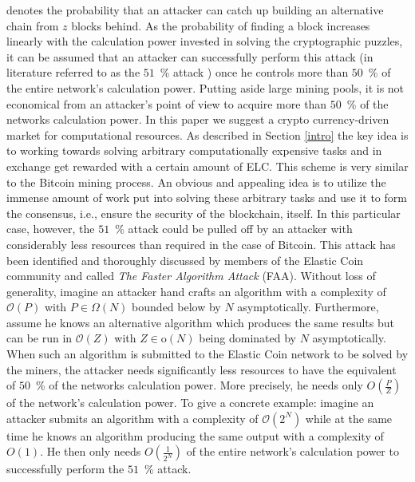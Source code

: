 \documentclass{sig-alternate}
\begin{document}
denotes the probability that an attacker can catch up building an alternative chain from $z$ blocks behind.
As the probability of finding a block increases linearly with the calculation power invested in solving the cryptographic puzzles, it can be assumed that an attacker can successfully perform this attack (in literature referred to as the $51$~\% attack \cite{eyal2014majority,vasek2014empirical}) once he controls more than $50$~\% of the entire network's calculation power.
Putting aside large mining pools, it is not economical from an attacker's point of view to acquire more than $50$~\% of the networks calculation power.
In this paper we suggest a crypto currency-driven market for computational resources. As described in Section \ref{intro} the key idea is to working towards solving arbitrary computationally expensive tasks and in exchange get rewarded with a certain amount of ELC.
This scheme is very similar to the Bitcoin mining process.
An obvious and appealing idea is to utilize the immense amount of work put into solving these arbitrary tasks and use it to form the consensus, i.e., ensure the security of the blockchain, itself. In this particular case, however, the $51$~\% attack could be pulled off by an attacker with considerably less resources than required in the case of Bitcoin. This attack has been identified and thoroughly discussed by members of the Elastic Coin community and called \emph{The Faster Algorithm Attack} (FAA).
Without loss of generality, imagine an attacker hand crafts an algorithm with a complexity of $\mathcal{O}(P)$ with $P \in \Omega(N)$ bounded below by $N$ asymptotically.
Furthermore, assume he knows an alternative algorithm which produces the same results but can be run in $\mathcal{O}(Z)$ with $Z \in \text{o}(N)$ being dominated by $N$ asymptotically.
When such an algorithm is submitted to the Elastic Coin network to be solved by the miners, the attacker needs significantly less resources to have the equivalent of $50$~\% of the networks calculation power. More precisely, he needs only $O(\frac{P}{Z})$ of the network's calculation power.
To give a concrete example: imagine an attacker submits an algorithm with a complexity of $\mathcal{O}(2^N)$ while at the same time he knows an algorithm producing the same output with a complexity of $O(1)$. He then only needs $O(\frac{1}{2^N})$ of the entire network's calculation power to successfully perform the $51$~\% attack.
\end{document}
